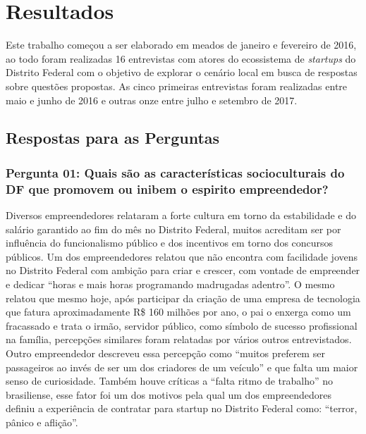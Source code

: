 \chapter[Resultados]{Resultados}
\label{cap-resultados}

Este trabalho começou a ser elaborado em meados de janeiro e fevereiro de 2016, ao todo foram realizadas 16 entrevistas com atores do ecossistema de \textit{startups} do Distrito Federal com o objetivo de explorar o cenário local em busca de respostas sobre questões propostas. As cinco primeiras entrevistas foram realizadas entre maio e junho de 2016 e outras onze entre julho e setembro de 2017.

\section{Respostas para as Perguntas}
\label{section:perguntas_de_pesquisa}

\subsection*{Pergunta 01: Quais são as características socioculturais do DF que promovem ou inibem o espirito empreendedor?}
\label{subsection:pergunta_de_pesquisa_1}

Diversos empreendedores relataram a forte cultura em torno da estabilidade e do salário garantido ao fim do mês no Distrito Federal, muitos acreditam ser por influência do funcionalismo público e dos incentivos em torno dos concursos públicos. Um dos empreendedores relatou que não encontra com facilidade jovens no Distrito Federal com ambição para criar e crescer, com vontade de empreender e dedicar ``horas e mais horas programando madrugadas adentro''. O mesmo relatou que mesmo hoje, após participar da criação de uma empresa de tecnologia que fatura aproximadamente R\$ 160 milhões por ano, o pai o enxerga como um fracassado e trata o irmão, servidor público, como símbolo de sucesso profissional na família, percepções similares foram relatadas por vários outros entrevistados. Outro empreendedor descreveu essa percepção como ``muitos preferem ser passageiros ao invés de ser um dos criadores de um veículo'' e que falta um maior senso de curiosidade. Também houve críticas a ``falta ritmo de trabalho'' no brasiliense, esse fator foi um dos motivos pela qual um dos empreendedores definiu a experiência de contratar para startup no Distrito Federal como: ``terror, pânico e aflição''. 

